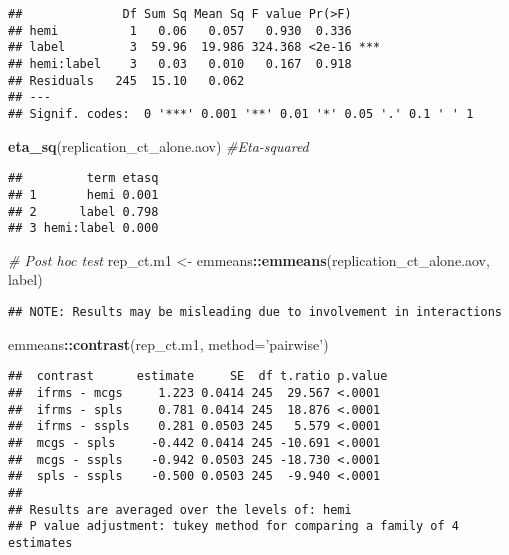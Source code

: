 \documentclass[
]{article}
\newenvironment{Shaded}{\begin{snugshade}}{\end{snugshade}}
\newcommand{\CommentTok}[1]{\textcolor[rgb]{0.56,0.35,0.01}{\textit{#1}}}
\newcommand{\DataTypeTok}[1]{\textcolor[rgb]{0.13,0.29,0.53}{#1}}
\newcommand{\KeywordTok}[1]{\textcolor[rgb]{0.13,0.29,0.53}{\textbf{#1}}}
\newcommand{\NormalTok}[1]{#1}
\newcommand{\OperatorTok}[1]{\textcolor[rgb]{0.81,0.36,0.00}{\textbf{#1}}}
\newcommand{\StringTok}[1]{\textcolor[rgb]{0.31,0.60,0.02}{#1}}
\begin{document}
\begin{verbatim}
##              Df Sum Sq Mean Sq F value Pr(>F)    
## hemi          1   0.06   0.057   0.930  0.336    
## label         3  59.96  19.986 324.368 <2e-16 ***
## hemi:label    3   0.03   0.010   0.167  0.918    
## Residuals   245  15.10   0.062                   
## ---
## Signif. codes:  0 '***' 0.001 '**' 0.01 '*' 0.05 '.' 0.1 ' ' 1
\end{verbatim}

\begin{Shaded}
\begin{Highlighting}[]
\KeywordTok{eta_sq}\NormalTok{(replication_ct_alone.aov) }\CommentTok{#Eta-squared}
\end{Highlighting}
\end{Shaded}

\begin{verbatim}
##         term etasq
## 1       hemi 0.001
## 2      label 0.798
## 3 hemi:label 0.000
\end{verbatim}

\begin{Shaded}
\begin{Highlighting}[]
\CommentTok{# Post hoc test}
\NormalTok{rep_ct.m1 <-}\StringTok{ }\NormalTok{emmeans}\OperatorTok{::}\KeywordTok{emmeans}\NormalTok{(replication_ct_alone.aov, }\OperatorTok{~}\StringTok{ }\NormalTok{label)}
\end{Highlighting}
\end{Shaded}

\begin{verbatim}
## NOTE: Results may be misleading due to involvement in interactions
\end{verbatim}

\begin{Shaded}
\begin{Highlighting}[]
\NormalTok{emmeans}\OperatorTok{::}\KeywordTok{contrast}\NormalTok{(rep_ct.m1, }\DataTypeTok{method=}\StringTok{'pairwise'}\NormalTok{)}
\end{Highlighting}
\end{Shaded}

\begin{verbatim}
##  contrast      estimate     SE  df t.ratio p.value
##  ifrms - mcgs     1.223 0.0414 245  29.567 <.0001 
##  ifrms - spls     0.781 0.0414 245  18.876 <.0001 
##  ifrms - sspls    0.281 0.0503 245   5.579 <.0001 
##  mcgs - spls     -0.442 0.0414 245 -10.691 <.0001 
##  mcgs - sspls    -0.942 0.0503 245 -18.730 <.0001 
##  spls - sspls    -0.500 0.0503 245  -9.940 <.0001 
## 
## Results are averaged over the levels of: hemi 
## P value adjustment: tukey method for comparing a family of 4 estimates
\end{verbatim}
\end{document}
